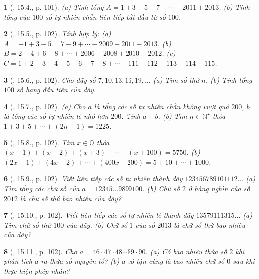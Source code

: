 \documentclass{article}
\newtheorem{baitoan}{}
\begin{document}
\begin{baitoan}[\cite{TLCT_THCS_Toan_6_so_hoc}, 15.4., p. 101]
	(a) Tính tổng $A = 1 + 3 + 5 + 7 + \cdots + 2011 + 2013$. (b) Tính tổng của $100$ số tự nhiên chẵn liên tiếp bắt đầu từ số $100$.
\end{baitoan}

\begin{baitoan}[\cite{TLCT_THCS_Toan_6_so_hoc}, 15.5., p. 102]
	Tính hợp lý: (a) $A = -1 + 3 - 5 = 7 - 9 + \cdots - 2009 + 2011 - 2013$. (b) $B = 2 - 4 + 6 - 8 + \cdots + 2006 - 2008 + 2010 - 2012$. (c) $C = 1 + 2 - 3 - 4 + 5 + 6 - 7 - 8 + \cdots - 111 - 112 + 113 + 114 + 115$.
\end{baitoan}

\begin{baitoan}[\cite{TLCT_THCS_Toan_6_so_hoc}, 15.6., p. 102]
	Cho dãy số $7,10,13,16,19,\ldots$ (a) Tìm số thứ $n$. (b) Tính tổng $100$ số hạng đầu tiên của dãy.
\end{baitoan}

\begin{baitoan}[\cite{TLCT_THCS_Toan_6_so_hoc}, 15.7., p. 102]
	(a) Cho $a$ là tổng các số tự nhiên chẵn không vượt quá $200$, $b$ là tổng các số tự nhiên lẻ nhỏ hơn $200$. Tính $a - b$. (b) Tìm $n\in\mathbb{N}^\star$ thỏa $1 + 3 + 5 + \cdots + (2n - 1) = 1225$.
\end{baitoan}

\begin{baitoan}[\cite{TLCT_THCS_Toan_6_so_hoc}, 15.8., p. 102]
	Tìm $x\in\mathbb{Q}$ thỏa $(x + 1) + (x + 2) + (x + 3) + \cdots + (x + 100) = 5750$. (b) $(2x - 1) + (4x - 2) + \cdots + (400x - 200) = 5 + 10 + \cdots + 1000$.
\end{baitoan}

\begin{baitoan}[\cite{TLCT_THCS_Toan_6_so_hoc}, 15.9., p. 102]
	Viết liên tiếp các số tự nhiên thành dãy $123456789101112\ldots$ (a) Tìm tổng các chữ số của $a = 12345\ldots9899100$. (b) Chữ số $2$ ở hàng nghìn của số $2012$ là chữ số thứ bao nhiêu của dãy?
\end{baitoan}

\begin{baitoan}[\cite{TLCT_THCS_Toan_6_so_hoc}, 15.10., p. 102]
	Viết liên tiếp các số tự nhiên lẻ thành dãy $13579111315\ldots$ (a) Tìm chữ số thứ $100$ của dãy. (b) Chữ số $1$ của số $2013$ là chữ số thứ bao nhiêu của dãy?
\end{baitoan}

\begin{baitoan}[\cite{TLCT_THCS_Toan_6_so_hoc}, 15.11., p. 102]
	Cho $a = 46\cdot47\cdot48\cdots89\cdot90$. (a) Có bao nhiêu thừa số $2$ khi phân tích $a$ ra thừa số nguyên tố? (b) $a$ có tận cùng là bao nhiêu chữ số $0$ sau khi thực hiện phép nhân?
\end{baitoan}
\end{document}
